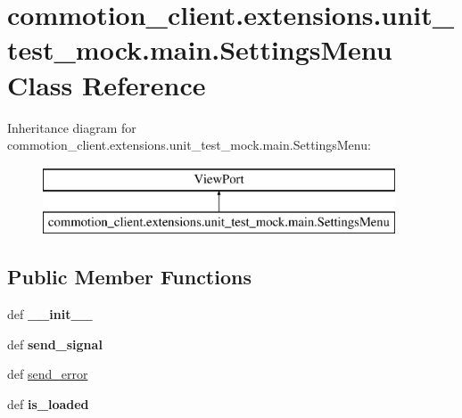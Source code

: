 \hypertarget{classcommotion__client_1_1extensions_1_1unit__test__mock_1_1main_1_1SettingsMenu}{\section{commotion\+\_\+client.\+extensions.\+unit\+\_\+test\+\_\+mock.\+main.\+Settings\+Menu Class Reference}
\label{classcommotion__client_1_1extensions_1_1unit__test__mock_1_1main_1_1SettingsMenu}
}
Inheritance diagram for commotion\+\_\+client.\+extensions.\+unit\+\_\+test\+\_\+mock.\+main.\+Settings\+Menu\+:\begin{figure}[H]
\begin{center}
\leavevmode
\includegraphics[height=2.000000cm]{classcommotion__client_1_1extensions_1_1unit__test__mock_1_1main_1_1SettingsMenu}
\end{center}
\end{figure}
\subsection*{Public Member Functions}
\begin{DoxyCompactItemize}
\item 
\hypertarget{classcommotion__client_1_1extensions_1_1unit__test__mock_1_1main_1_1SettingsMenu_adc3fb62d4e0b2011216723f07bd2694d}{def {\bfseries \+\_\+\+\_\+init\+\_\+\+\_\+}}\label{classcommotion__client_1_1extensions_1_1unit__test__mock_1_1main_1_1SettingsMenu_adc3fb62d4e0b2011216723f07bd2694d}

\item 
\hypertarget{classcommotion__client_1_1extensions_1_1unit__test__mock_1_1main_1_1SettingsMenu_a5e9a06e14061c35b87ffcc147f87ebb9}{def {\bfseries send\+\_\+signal}}\label{classcommotion__client_1_1extensions_1_1unit__test__mock_1_1main_1_1SettingsMenu_a5e9a06e14061c35b87ffcc147f87ebb9}

\item 
def \hyperlink{classcommotion__client_1_1extensions_1_1unit__test__mock_1_1main_1_1SettingsMenu_a12d8517f6e318038b3a57cf2f33907c4}{send\+\_\+error}
\item 
\hypertarget{classcommotion__client_1_1extensions_1_1unit__test__mock_1_1main_1_1SettingsMenu_ac74ab98887439dcafa298ab4610cb8c8}{def {\bfseries is\+\_\+loaded}}\label{classcommotion__client_1_1extensions_1_1unit__test__mock_1_1main_1_1SettingsMenu_ac74ab98887439dcafa298ab4610cb8c8}

\end{DoxyCompactItemize}
